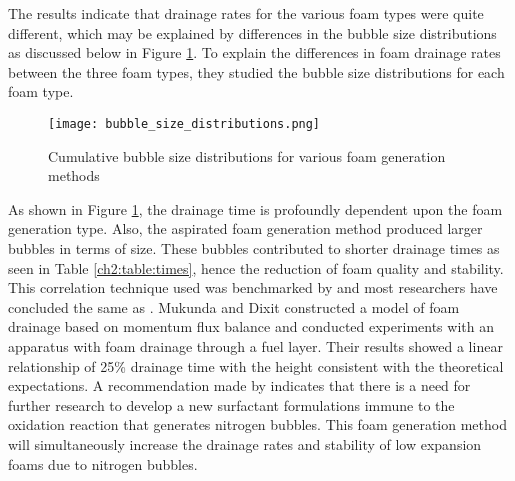 The results indicate that drainage rates for the various foam types were quite different, which may be explained by differences in the bubble size distributions as discussed below in Figure \ref{ch2:figure:distributions}. To explain the differences in foam drainage rates between the three foam types, they studied the bubble size distributions for each foam type.

\begin{figure}[H]
    \centering
    \texttt{[image: bubble\_size\_distributions.png]}
    \caption{Cumulative bubble size distributions for various foam generation methods}
    \label{ch2:figure:distributions}
\end{figure}

As shown in Figure \ref{ch2:figure:distributions}, the drainage time is profoundly dependent upon the foam generation type. Also, the aspirated foam generation method produced larger bubbles in terms of size. These bubbles contributed to shorter drainage times as seen in Table \ref{ch2:table:times}, hence the reduction of foam quality and stability. This correlation technique used was benchmarked by \cite{oguike2013study} and most researchers have concluded the same as \cite{laundess2012suppression}. Mukunda and Dixit \cite{csb2016phenomenological} constructed a model of foam drainage based on momentum flux balance and conducted experiments with an apparatus with foam drainage through a fuel layer. Their results showed a linear relationship of 25\% drainage time with the height consistent with the theoretical expectations. A recommendation made by \cite{laundess2012suppression} indicates that there is a need for further research to develop a new surfactant formulations immune to the oxidation reaction that generates nitrogen bubbles. This foam generation method will simultaneously increase the drainage rates and stability of low expansion foams due to nitrogen bubbles.


